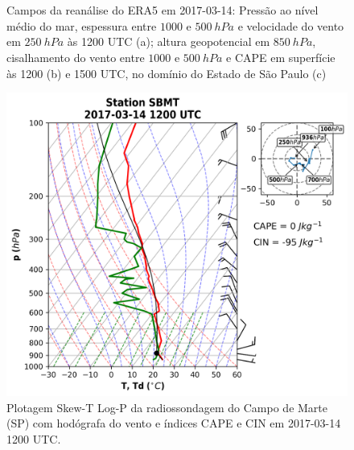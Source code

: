 \begin{figure}[htb]
	\begin{center}
		\caption{Campos da reanálise do ERA5 em 2017-03-14: Pressão ao nível médio do mar, espessura entre $1000$ e $500\:hPa$ e velocidade do vento em $250\:hPa$ às 1200 UTC (a); altura geopotencial em $850\:hPa$, cisalhamento do vento entre $1000$ e $500\:hPa$ e CAPE em superfície às 1200 (b) e 1500 UTC, no domínio do Estado de São Paulo (c)} 
		\label{era5_20170314_main}
		 \\
		 \\
	\end{center}
\end{figure}

\begin{figure}[hp]
	\begin{center}
		\caption{Plotagem Skew-T Log-P da radiossondagem do Campo de Marte (SP) com hodógrafa do vento e índices CAPE e CIN em 2017-03-14 1200 UTC.} 
		\label{sondagem_20170314}
		\includegraphics[width=0.75\columnwidth]{../Sounding_Processing/figures/sounding_SBMT2017031412UTC.png}
	\end{center}
\end{figure}

